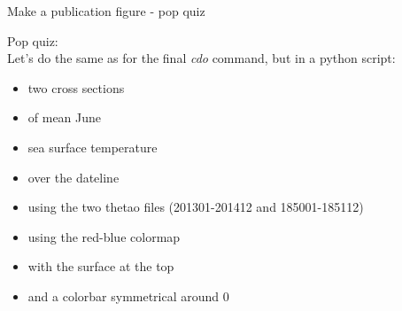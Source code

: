 \begin{frame}{\insertsectionnumber{ |} Make a publication figure - pop quiz} 
    \begin{beamerboxesrounded}[lower=gray,shadow=true]{
        Pop quiz: \\
            \vspace{0.3cm}
        Let's do the same as for the final \textit{cdo} command, but in a python script:\\
            \begin{itemize}
                \item two cross sections
                    \vspace{0.15cm}
                \item of mean June
                    \vspace{0.15cm}
                \item sea surface temperature
                    \vspace{0.15cm}
                \item over the dateline
                    \vspace{0.3cm}
                \item using the two thetao files (201301-201412 and 185001-185112)
                    \vspace{0.15cm}
                \item using the red-blue colormap
                    \vspace{0.15cm}
                \item with the surface at the top 
                    \vspace{0.15cm}
                \item and a colorbar symmetrical around 0
            \end{itemize}
                \vspace{1.5cm}}
    \end{beamerboxesrounded}
\end{frame}


